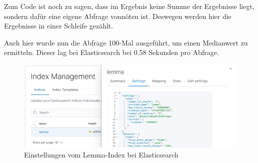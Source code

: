 Zum Code ist noch zu sagen, dass im Ergebnis keine Summe der Ergebnisse liegt, sondern dafür eine eigene Abfrage vonnöten ist. Deswegen werden hier die Ergebnisse in einer Schleife gezählt.

Auch hier wurde nun die Abfrage 100-Mal ausgeführt, um einen Medianwert zu ermitteln. Dieser lag bei Elasticsearch bei 0.58 Sekunden pro Abfrage.

\begin{figure}
	\centering
	\includegraphics[width=1\linewidth]{images/elastic_index_settings.png}
	\caption{Einstellungen vom Lemma-Index bei Elasticsearch}
	\label{img:elasticIndexSettings}
\end{figure}


